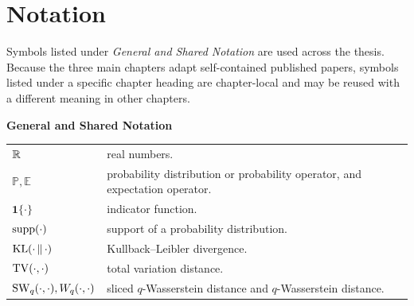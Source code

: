 \chapter*{Notation}

Symbols listed under \emph{General and Shared Notation} are used across the thesis. Because the three main chapters adapt self-contained published papers, symbols listed under a specific chapter heading are chapter-local and may be reused with a different meaning in other chapters.

\medskip
\noindent\textbf{General and Shared Notation}\par\smallskip
\begin{tabularx}{\textwidth}{lX}
  \(\mathbb{R}\) & real numbers. \\
  \(\mathbb{P}, \mathbb{E}\) & probability distribution or probability operator, and expectation operator. \\
  \(\mathbf{1}\{\cdot\}\) & indicator function. \\
  \(\operatorname{supp}(\cdot)\) & support of a probability distribution. \\
  \(\operatorname{KL}(\cdot\,\|\,\cdot)\) & Kullback--Leibler divergence. \\
  \(\operatorname{TV}(\cdot,\cdot)\) & total variation distance. \\
  \(\operatorname{SW}_q(\cdot,\cdot), W_q(\cdot,\cdot)\) & sliced \(q\)-Wasserstein distance and \(q\)-Wasserstein distance. \\
\end{tabularx}

